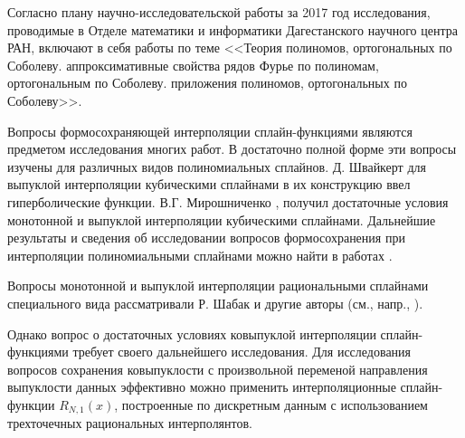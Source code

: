 \Introduction

Согласно плану научно-исследовательской работы за 2017 год исследования, проводимые в Отделе математики и информатики Дагестанского научного центра РАН, включают в себя работы по теме
<<Теория полиномов, ортогональных по Соболеву. аппроксимативные свойства рядов Фурье по полиномам, ортогональным по Соболеву. приложения полиномов, ортогональных по Соболеву>>.





Вопросы формосохраняющей интерполяции сплайн-функциями являются предметом
 исследования многих работ. В достаточно полной форме эти вопросы изучены для различных
видов полиномиальных сплайнов. Д. Швайкерт \cite{ark-1} для выпуклой интерполяции кубическими
сплайнами в их конструкцию ввел гиперболические функции. В.Г. Мирошниченко \cite{ark-2},\cite{ark-3}
 получил достаточные условия монотонной и выпуклой интерполяции кубическими сплайнами.
Дальнейшие результаты и сведения об исследовании вопросов формосохранения при интерполяции
полиномиальными сплайнами можно найти в работах \cite{ark-4, ark-5, ark-6, ark-7}.

Вопросы монотонной и выпуклой интерполяции рациональными сплайнами
специального вида рассматривали Р. Шабак \cite{ark-8} и другие авторы (см., напр.,
\cite{ark-9, ark-10, ark-11}).

Однако вопрос о достаточных условиях ковыпуклой интерполяции сплайн-функциями
требует своего дальнейшего исследования. Для исследования вопросов сохранения ковыпуклости
  с произвольной переменой направления выпуклости данных эффективно можно применить
интерполяционные сплайн-функции $R_{N,1}(x)$, построенные по дискретным данным с
использованием трехточечных рациональных интерполянтов.






